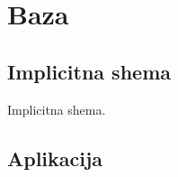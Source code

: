 \section{Baza}

\subsection{Implicitna shema} \label{subsec:implicitna}
Implicitna shema.

\subsection{Aplikacija}

